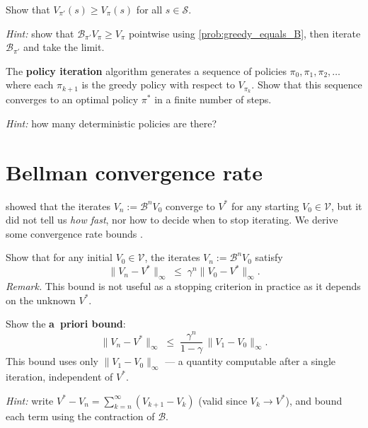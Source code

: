 \documentclass[11pt]{article}
\newcommand{\cS}{\mathcal{S}}
\begin{document}
\begin{exercise}
\label{prob:policy_improvement_thm} Show that $V_{\pi'}(s) \ge V_\pi(s)$ for all $s \in \cS$.

\textit{Hint:} show that $\mathcal{B}_{\pi'} V_\pi \ge V_\pi$ pointwise using \cref{prob:greedy_equals_B}, then iterate $\mathcal{B}_{\pi'}$ and take the limit.
\end{exercise}


\begin{exercise}
\label{prob:policy_iteration} The \textbf{policy iteration} algorithm generates a sequence of policies $\pi_0, \pi_1, \pi_2, \ldots$ where each $\pi_{k+1}$ is the greedy policy with respect to $V_{\pi_k}$. Show that this sequence converges to an optimal policy $\pi^*$ in a finite number of steps.

\textit{Hint:} how many deterministic policies are there?
\end{exercise}





\section{Bellman convergence rate}\label{prob:convergence_rate}

 showed that the iterates $V_n := \mathcal{B}^n V_0$ converge to $V^*$ for any starting $V_0 \in \mathcal{V}$, but it did not tell us \emph{how fast}, nor how to decide when to stop iterating. We derive some convergence rate bounds \cite[Chapter~6]{putermanMarkovDecisionProcesses1994}.

\begin{exercise}
\label{prob:geometric_decay} Show that for any initial $V_0 \in \mathcal{V}$, the iterates $V_n := \mathcal{B}^n V_0$ satisfy
$$
\|V_n - V^*\|_\infty \;\le\; \gamma^n \|V_0 - V^*\|_\infty.
$$
\emph{Remark.} This bound is not useful as a stopping criterion in practice as it depends on the unknown $V^*$.
\end{exercise}


\begin{exercise}
\label{prob:a_priori_bound} Show the \textbf{a~priori bound}:
$$
\|V_n - V^*\|_\infty \;\le\; \frac{\gamma^n}{1-\gamma}\, \|V_1 - V_0\|_\infty.
$$
This bound uses only $\|V_1 - V_0\|_\infty$ --- a quantity computable after a single iteration, independent of $V^*$.

\textit{Hint:} write $V^* - V_n = \sum_{k=n}^{\infty}(V_{k+1} - V_k)$ (valid since $V_k \to V^*$), and bound each term using the contraction of $\mathcal{B}$.
\end{exercise}
\end{document}
